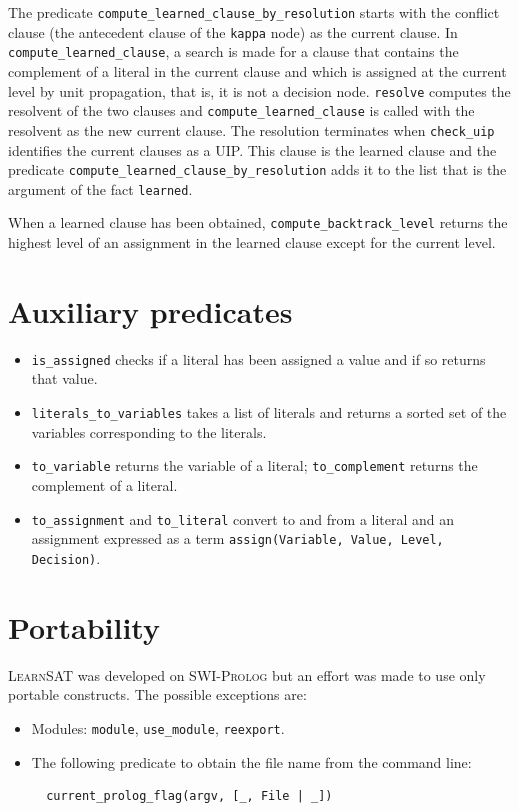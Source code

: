 \documentclass[11pt]{report}
\newcommand*{\p}[1]{\textup{\texttt{#1}}}
\newcommand*{\ls}{\textsc{LearnSAT}}
\newcommand*{\sw}{\textsc{SWI-Prolog}}
\begin{document}
The predicate \p{compute\_learned\_clause\_by\_resolution} starts with
the conflict clause (the antecedent clause of the \p{kappa} node) as the
current clause. In \p{compute\_learned\_clause}, a search is made for a
clause that contains the complement of a literal in the current clause
and which is assigned at the current level by unit propagation, that is,
it is not a decision node. \p{resolve} computes the resolvent of the two
clauses and \p{compute\_learned\_clause} is called with the resolvent as
the new current clause. The resolution terminates when \p{check\_uip}
identifies the current clauses as a UIP. This clause is the learned
clause and the predicate \p{compute\_learned\_clause\_by\_resolution}
adds it to the list that is the argument of the fact \p{learned}.

When a learned clause has been obtained, \p{compute\_backtrack\_level}
returns the highest level of an assignment in the learned clause except
for the current level.


\section{Auxiliary predicates}\label{s.aux}

\begin{itemize}

\item \p{is\_assigned} checks if a literal has been assigned a value
and if so returns that value.

\item \p{literals\_to\_variables} takes a list of literals and returns a
sorted set of the variables corresponding to the literals.

\item \p{to\_variable} returns the variable of a literal;
\p{to\_complement} returns the complement of a literal.

\item \p{to\_assignment} and \p{to\_literal} convert to and from a
literal and an assignment expressed as a term \p{assign(Variable, Value,
Level, Decision)}.

\end{itemize}


\section{Portability}\label{s.port}

\ls{} was developed on \sw{} but an effort was made to use only portable
constructs. The possible exceptions are:

\begin{itemize}
\item Modules: \p{module}, \p{use\_module}, \p{reexport}.
\item The following predicate to obtain the file name from the command
line:
\begin{verbatim}
  current_prolog_flag(argv, [_, File | _])
\end{verbatim}
\end{itemize}



\end{document}
